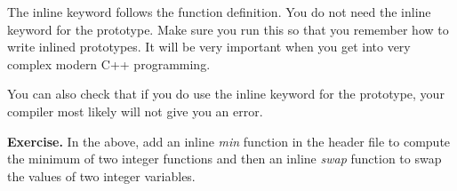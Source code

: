 \documentclass[
]{article}
\begin{document}
The inline keyword follows the function definition. You do not need the
inline keyword for the prototype. Make sure you run this so that you
remember how to write inlined prototypes. It will be very important when
you get into very complex modern C++ programming.

You can also check that if you do use the inline keyword for the
prototype, your compiler most likely will not give you an error.

\textbf{Exercise.} In the above, add an inline \emph{min} function in
the header file to compute the minimum of two integer functions and then
an inline \emph{swap} function to swap the values of two integer
variables.
\end{document}
